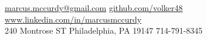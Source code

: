 \documentclass[10pt,a4paper]{article}
\begin{document}
\sloppy  %


\nobreakvspace{0.3em}  %

\noindent\href{mailto:marcus.mccurdy@gmail.com}
{marcus.mccurdy\mbox{}@\mbox{}gmail.com}\sbull
\href{http://github.com/volker48}{github.com/volker48} \sbull
\href{http://www.linkedin.com/in/marcusmccurdy}
    {www.linkedin.com/in/marcusmccurdy}
\\
240 Montrose ST\sbull
Philadelphia, PA 19147 \sbull {}714-791-8345

\spacedhrule{0.9em}{-0.4em}  %

%
%
%
%
\end{document}
